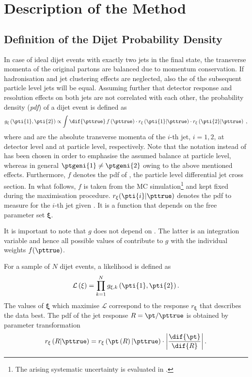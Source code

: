 

\section{Description of the Method}\label{sec:ResFit:Method}

\subsection{Definition of the Dijet Probability Density}
In case of ideal dijet events with exactly two jets in the final
state, the transverse momenta of the original partons are balanced due
to momentum conservation.
If hadronisation and jet clustering effects are neglected, also the
\ptgen of the subsequent particle level jets will be equal.
Assuming further that detector response and resolution effects on both jets are not correlated with each other, the probability density (\textit{pdf}) of a dijet event is defined as
\begin{equation}
  \label{eq:ResFit:DijetPdf}
  g_{\mathbf{\xi}}\left(\pti{1},\pti{2}\right) \propto \int\dif{\pttrue}\,f\left(\pttrue\right)
  \cdot r_{\mathbf{\xi}}\left(\pti{1}|\pttrue\right)
  \cdot r_{\mathbf{\xi}}\left(\pti{2}|\pttrue\right) \; ,
\end{equation}
where  and \pttrue are the absolute transverse momenta of the
$i$-th jet, \mbox{$i = 1,2$}, at detector level and at particle level, respectively.
Note that the notation \pttrue instead of \ptgen has been chosen in order to emphasise the assumed \pt
balance at particle level, whereas in general \mbox{$\ptgeni{1} \neq \ptgeni{2}$} owing to the above
mentioned effects.
Furthermore, $f$ denotes the pdf of \pttrue, \ie the particle level differential jet 
cross section.
In what follows, $f$ is taken from the MC
simulation\footnote{The arising systematic uncertainty is evaluated in
  .}
and kept fixed during the maximisation procedure.
$r_{\mathbf{\xi}}(\pti{i}|\pttrue)$ denotes the pdf to measure  for the
$i$-th jet given \pttrue.
It is a function that depends on the free parameter set $\mathbf{\xi}$.

It is important to note that $g$ does not depend on \pttrue.
The latter is an integration variable and hence all possible values of \pttrue
contribute to $g$ with the individual weights $f(\pttrue)$.

For a sample of $N$ dijet events, a likelihood is defined as
\begin{equation}
  \label{eq:ResFit:Likelihood}
  \mathcal{L}\left(\mathbf{\xi}\right) = \prod^{N}_{k=1} g_{\mathbf{\xi},k}\left(\pti{1},\pti{2}\right).
\end{equation}
The values of $\mathbf{\xi}$ which maximise $\mathcal{L}$ correspond
to the response $r_{\mathbf{\xi}}$ that describes the data best.
The pdf of the jet \pt response \mbox{$R = \pt / \pttrue$} is obtained by parameter transformation
\begin{equation*}
  r_{\mathbf{\xi}}\left(R|\pttrue\right) =
  r_{\mathbf{\xi}}\left(\pt\left(R\right)|\pttrue\right)\cdot\left|\frac{\dif{\pt}}{\dif{R}}\right|.
\end{equation*}


